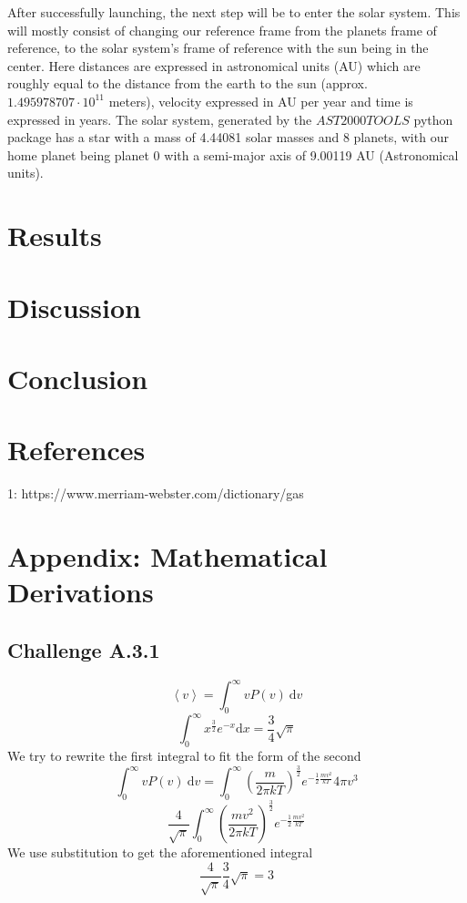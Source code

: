 \documentclass[reprint,english,notitlepage]{revtex4-2}
\begin{document}
After successfully launching, the next step will be to enter the solar system.
This will mostly consist of changing our reference frame from the planets frame of reference, to the solar system's frame of reference with the sun being in the center.
Here distances are expressed in astronomical units (AU) which are roughly equal to the distance from the earth to the sun (approx. $1.495978707 \cdot 10^{11}$ meters), velocity expressed in AU per year and time is expressed in years.
The solar system, generated by the $AST2000TOOLS$ python package has a star with a mass of 4.44081 solar masses and 8 planets, with our home planet being planet 0 with a semi-major axis of 9.00119 AU (Astronomical units).

\section{Results}
\section{Discussion}
\section{Conclusion}
\section{References}
1: https://www.merriam-webster.com/dictionary/gas
\section{Appendix: Mathematical Derivations}
	\subsection*{Challenge A.3.1}
	\[
	\left< v \right> =  \int_{0}^{\infty} vP(v) \ \mathrm{d}v
	\]
	\[
	\int_{0}^{\infty} x^{\frac{3}{2}} e^{-x} \mathrm{d}x = \frac{3}{4} \sqrt{\pi}  
	\]
	We try to rewrite the first integral to fit the form of the second 
	\[
	\int _{0}^{\infty} vP(v) \ \mathrm{d}v = \int _{0}^{\infty} \left( \frac{m}{2 \pi k T} \right) ^{\frac{3}{2}} e ^{-\frac{1}{2} \frac{mv^{2}}{k T}} 4 \pi v^{3}
	\]\newline 
	\[
	\frac{4}{\sqrt{\pi}} \int _{0}^{\infty} \left( \frac{mv^{2}}{2 \pi k T} \right) ^{\frac{3}{2}} e ^{-\frac{1}{2} \frac{mv^{2}}{k T}} 
	\]
	We use substitution to get the aforementioned integral
	\[
	\frac{4}{\sqrt{\pi}} \frac{3}{4} \sqrt{\pi} = 3
	\]
\end{document}

